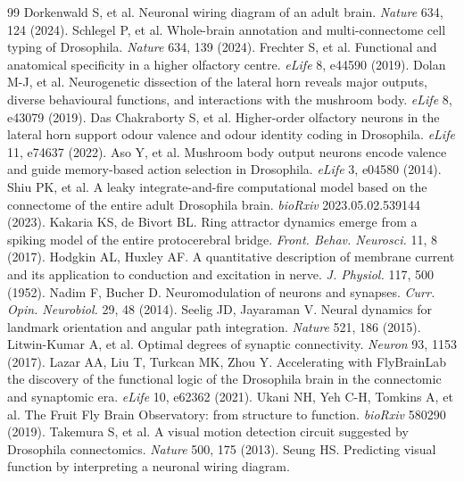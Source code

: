 \documentclass[9pt,twocolumn,twoside]{article}
\begin{document}
\begin{thebibliography}{99}\small
{} Dorkenwald S, et al. Neuronal wiring diagram of an adult brain.
\textit{Nature} 634, 124 (2024).
 Schlegel P, et al. Whole-brain annotation and multi-connectome cell typing of
Drosophila. \textit{Nature} 634, 139 (2024).
 Frechter S, et al. Functional and anatomical specificity in a higher olfactory
centre. \textit{eLife} 8, e44590 (2019).
 Dolan M-J, et al. Neurogenetic dissection of the lateral horn reveals major
outputs, diverse behavioural functions, and interactions with the mushroom body. \textit{eLife} 8,
e43079 (2019).
 Das Chakraborty S, et al. Higher-order olfactory neurons in the lateral
horn support odour valence and odour identity coding in Drosophila. \textit{eLife} 11, e74637 (2022).
 Aso Y, et al. Mushroom body output neurons encode valence and guide memory-based
action selection in Drosophila. \textit{eLife} 3, e04580 (2014).
 Shiu PK, et al. A leaky integrate-and-fire computational model based on the
connectome of the entire adult Drosophila brain. \textit{bioRxiv} 2023.05.02.539144 (2023).
 Kakaria KS, de Bivort BL. Ring attractor dynamics emerge from a spiking model
of the entire protocerebral bridge. \textit{Front. Behav. Neurosci.} 11, 8 (2017).
 Hodgkin AL, Huxley AF. A quantitative description of membrane current and its
application to conduction and excitation in nerve. \textit{J. Physiol.} 117, 500 (1952).
 Nadim F, Bucher D. Neuromodulation of neurons and synapses. \textit{Curr. Opin.
Neurobiol.} 29, 48 (2014).
 Seelig JD, Jayaraman V. Neural dynamics for landmark orientation and angular path
integration. \textit{Nature} 521, 186 (2015).
 Litwin-Kumar A, et al. Optimal degrees of synaptic connectivity.
\textit{Neuron} 93, 1153 (2017).
 Lazar AA, Liu T, Turkcan MK, Zhou Y. Accelerating with FlyBrainLab the discovery
of the functional logic of the Drosophila brain in the connectomic and synaptomic era.
\textit{eLife} 10, e62362 (2021).
 Ukani NH, Yeh C-H, Tomkins A, et al. The Fruit Fly Brain Observatory: from
structure to function. \textit{bioRxiv} 580290 (2019).
 Takemura S, et al. A visual motion detection circuit suggested by Drosophila
connectomics. \textit{Nature} 500, 175 (2013).
 Seung HS. Predicting visual function by interpreting a neuronal wiring diagram.

\end{thebibliography}
\end{document}
